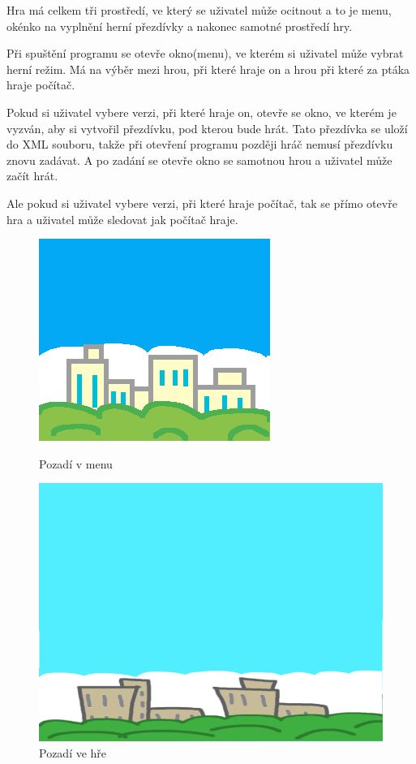 Hra má celkem tři prostředí, ve který se uživatel může ocitnout a to je menu, okénko na vyplnění herní přezdívky a nakonec samotné prostředí hry.

Při spuštění programu se otevře okno(menu), ve kterém si uživatel může vybrat herní režim. Má na výběr mezi hrou, při které hraje on a hrou při které za ptáka hraje počítač. 

Pokud si uživatel vybere verzi, při které hraje on, otevře se okno, ve kterém je vyzván, aby si vytvořil přezdívku, pod kterou bude hrát. Tato přezdívka se uloží do XML souboru, takže při otevření programu později hráč nemusí přezdívku znovu zadávat. A po zadání se otevře okno se samotnou hrou a uživatel může začít hrát.

Ale pokud si uživatel vybere verzi, při které hraje počítač, tak se přímo otevře hra a uživatel může sledovat jak počítač hraje. 
\begin{figure}[!htb]
   \begin{minipage}{0.48\textwidth}
     \centering
     \includegraphics[width=.7\linewidth]{images/MenuBackground.png}
     \caption{Pozadí v menu}\label{Fig:Data1}
   \end{minipage}\hfill
   \begin{minipage}{0.5\textwidth}
     \centering
     \includegraphics[width=.7\linewidth]{images/MainBackground.png}
     \caption{Pozadí ve hře}\label{Fig:Data2}
   \end{minipage}
\end{figure}


